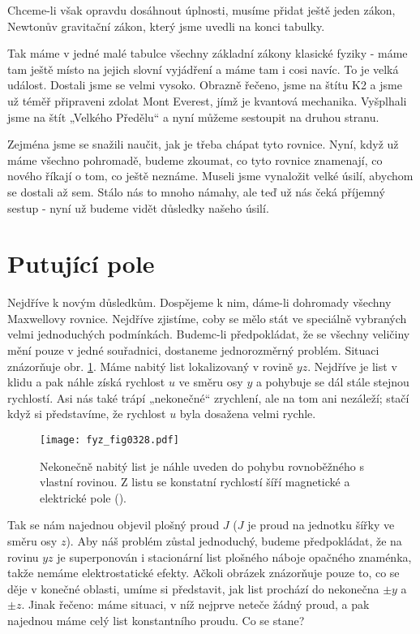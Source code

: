   Chceme-li však opravdu dosáhnout úplnosti, musíme přidat ještě jeden zákon, Newtonův gravitační 
  zákon, který jsme uvedli na konci tabulky.

  Tak máme v jedné malé tabulce všechny základní zákony klasické fyziky - máme tam ještě místo 
  na jejich slovní vyjádření a máme tam i cosi navíc. To je velká událost. Dostali jsme se velmi 
  vysoko. Obrazně řečeno, jsme na štítu K2 a jsme už téměř připraveni zdolat Mont Everest, jímž je 
  kvantová mechanika. Vyšplhali jsme na štít „Velkého Předělu“ a nyní můžeme sestoupit na druhou 
  stranu.
  
  Zejména jsme se snažili naučit, jak je třeba chápat tyto rovnice. Nyní, když už máme všechno 
  pohromadě, budeme zkoumat, co tyto rovnice znamenají, co nového říkají o tom, co ještě neznáme. 
  Museli jsme vynaložit velké úsilí, abychom se dostali až sem. Stálo nás to mnoho námahy, ale teď 
  už nás čeká příjemný sestup - nyní už budeme vidět důsledky našeho úsilí.
  
\section{Putující pole}\label{fyz:IIchapXVIIIsecIII}
  Nejdříve k novým důsledkům. Dospějeme k nim, dáme-li dohromady všechny Maxwellovy rovnice. 
  Nejdříve zjistíme, coby se mělo stát ve speciálně vybraných velmi jednoduchých podmínkách. 
  Budemc-li předpokládat, že se všechny veličiny mění pouze v jedné souřadnici, dostaneme 
  jednorozměrný problém. Situaci znázorňuje obr. \ref{fyz:fig0328}. Máme nabitý list lokalizovaný v 
  rovině \(yz\). Nejdříve je list v klidu a pak náhle získá rychlost \(u\) ve směru osy \(y\) a 
  pohybuje se dál stále stejnou rychlostí. Asi nás také trápí „nekonečné“ zrychlení, ale na tom ani 
  nezáleží; stačí když si představíme, že rychlost \(u\) byla dosažena velmi rychle.

  \begin{figure}[ht!]  %
    \centering
    \texttt{[image: fyz\_fig0328.pdf]}
    \caption{Nekonečně nabitý list je náhle uveden do pohybu rovnoběžného s vlastní rovinou. Z listu
             se konstatní rychlostí šíří magnetické a elektrické pole
             (\cite[s.~323]{Feynman02}).}
    \label{fyz:fig0328}
  \end{figure}

  Tak se nám najednou objevil plošný proud \(J\) (\(J\) je proud na jednotku šířky ve směru osy 
  \(z\)). Aby náš problém zůstal jednoduchý, budeme předpokládat, že na rovinu \(yz\) je 
  superponován i stacionární list plošného náboje opačného znaménka, takže nemáme elektrostatické 
  efekty. Ačkoli obrázek znázorňuje pouze to, co se děje v konečné oblasti, umíme si představit, 
  jak list prochází do nekonečna \(\pm y\) a \(\pm z\). Jinak řečeno: máme situaci, v níž nejprve 
  neteče žádný proud, a pak najednou máme celý list konstantního proudu. Co se stane?
  

